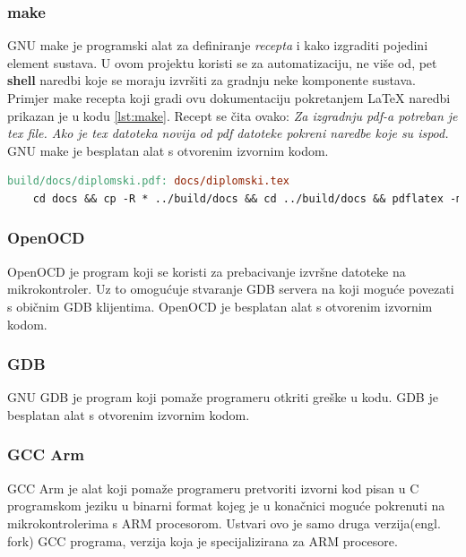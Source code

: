 \documentclass[times, utf8, diplomski]{diplomski}
\begin{document}
\subsubsection{make}
GNU make je programski alat za definiranje \textit{recepta} i kako izgraditi pojedini element sustava. U ovom projektu koristi se za automatizaciju, ne više od, pet \textbf{shell} naredbi koje se moraju izvršiti za gradnju neke komponente sustava. Primjer make recepta koji gradi ovu dokumentaciju pokretanjem \LaTeX \cite{ungar2002uvod} naredbi prikazan je u kodu \ref{lst:make}. Recept se čita ovako: \textit{Za izgradnju pdf-a potreban je tex file. Ako je tex datoteka novija od pdf datoteke pokreni naredbe koje su ispod.} GNU make je besplatan alat s otvorenim izvornim kodom.

\begin{lstlisting}[language=make, label={lst:make}, caption={Gradnja dokumentacije korištenjem make recepta}]
build/docs/diplomski.pdf: docs/diplomski.tex
	cd docs && cp -R * ../build/docs && cd ../build/docs && pdflatex -mltex diplomski.tex && bibtex diplomski && pdflatex -mltex diplomski.tex
\end{lstlisting}

\subsubsection{OpenOCD}
OpenOCD \cite{openocd} je program koji se koristi za prebacivanje izvršne datoteke na mikrokontroler. Uz to omogućuje stvaranje GDB servera na koji moguće povezati s običnim GDB klijentima. OpenOCD je besplatan alat s otvorenim izvornim kodom.

\subsubsection{GDB}
GNU GDB \cite{gdb} je program koji pomaže programeru otkriti greške u kodu. GDB je besplatan alat s otvorenim izvornim kodom.

\subsubsection{GCC Arm}
GCC Arm \cite{armgcc} je alat koji pomaže programeru pretvoriti izvorni kod pisan u C programskom jeziku u binarni format kojeg je u konačnici moguće pokrenuti na mikrokontrolerima s ARM procesorom. Ustvari ovo je samo druga verzija(engl. fork) GCC \cite{gcc} programa, verzija koja je specijalizirana za ARM procesore.
\end{document}
